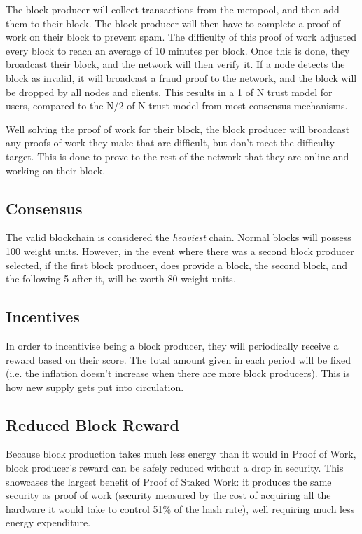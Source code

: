 \documentclass[12pt, letterpaper]{article}
\begin{document}
The block producer will collect transactions from the mempool, and then add them
to their block. The block producer will then have to complete a proof of work on
their block to prevent spam. The difficulty of this proof of work adjusted every
block to reach an average of 10 minutes per block. Once this is done, they
broadcast their block, and the network will then verify it. If a node detects
the block as invalid, it will broadcast a fraud proof to the network, and the
block will be dropped by all nodes and clients. This results in a 1 of N trust
model for users, compared to the N/2 of N trust model from most consensus
mechanisms.

Well solving the proof of work for their block, the block producer will
broadcast any proofs of work they make that are difficult, but don't meet the
difficulty target. This is done to prove to the rest of the network that they
are online and working on their block.

\subsection{Consensus}
The valid blockchain is considered the \textit{heaviest} chain. Normal blocks
will possess 100 weight units. However, in the event where there was a second
block producer selected, if the first block producer, does provide a block, the
second block, and the following 5 after it, will be worth 80 weight units.

\subsection{Incentives}
In order to incentivise being a block producer, they will periodically receive a
reward based on their score. The total amount given in each period will be fixed
(i.e. the inflation doesn't increase when there are more block producers). This
is how new supply gets put into circulation.

\subsection{Reduced Block Reward}
Because block production takes much less energy than it would in Proof of Work,
block producer's reward can be safely reduced without a drop in security. This
showcases the largest benefit of Proof of Staked Work: it produces the same
security as proof of work (security measured by the cost of acquiring all the
hardware it would take to control 51\% of the hash rate), well requiring much
less energy expenditure.
\end{document}
